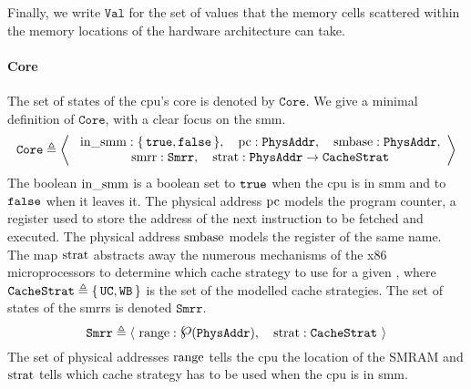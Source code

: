 Finally, we write $\texttt{Val}$ for the set of values that the memory cells
scattered within the memory locations of the hardware architecture can take.

\paragraph{Core}
%
The set of states of the \ac{cpu}'s core is denoted by $\texttt{Core}$. We give
a minimal definition of $\texttt{Core}$, with a clear focus on the \ac{smm}.
%
\[
  \texttt{Core} \triangleq \left<\
    \begin{array}{c}
      \mathrm{in\_smm} : \{\,\mathtt{true},
      \mathtt{false}\,\},\quad\mathrm{pc}: \texttt{PhysAddr},\quad\mathrm{smbase} :
      \texttt{PhysAddr}, \\
      \mathrm{smrr} : \texttt{Smrr},\quad\mathrm{strat} :
      \texttt{PhysAddr} \rightarrow \texttt{CacheStrat}
    \end{array}
  \right>
\]
%
The boolean $\mathrm{in\_smm}$ is a boolean set to $\mathtt{true}$ when the \ac{cpu}
is in \ac{smm} and to $\mathtt{false}$ when it leaves it.
%
The physical address $\mathrm{pc}$ models the program counter, a register used to
store the address of the next instruction to be fetched and executed.
%
The physical address $\mathrm{smbase}$ models the register of the same name.
%
The map $\mathrm{strat}$ abstracts away the numerous mechanisms of the x86
microprocessors to determine which cache strategy to use for a given \IO, where
$\texttt{CacheStrat} \triangleq \{\,\mathtt{UC}, \mathtt{WB}\,\}$ is the set of
the modelled cache strategies.
%
The set of states of the \acp{smrr} is denoted $\texttt{Smrr}$.
%
\[
  \texttt{Smrr} \triangleq \langle~\func{range}:
  \powerset(\texttt{PhysAddr}),\quad\func{strat}: \texttt{CacheStrat}~\rangle
\]
%
The set of physical addresses $\mathrm{range}$ tells the \ac{cpu} the location of
the SMRAM and $\mathrm{strat}$ tells which cache strategy has to be used when the
\ac{cpu} is in \ac{smm}.


